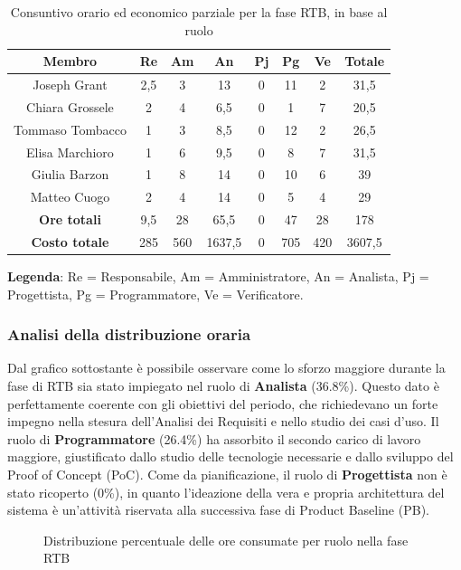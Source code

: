 \documentclass[11pt,a4paper]{article}
\begin{document}
\begin{table}[H]
    \centering
    \begin{tabular}{|c|c|c|c|c|c|c|c|}
        \hline
        \textbf{Membro} & \textbf{Re} & \textbf{Am} & \textbf{An} & \textbf{Pj} & \textbf{Pg} & \textbf{Ve} & \textbf{Totale} \\
        \hline
        Joseph Grant & 2,5 & 3 & 13 & 0 & 11 & 2 & 31,5 \\
        Chiara Grossele & 2 & 4 & 6,5 & 0 & 1 & 7 & 20,5 \\
        Tommaso Tombacco & 1 & 3 & 8,5 & 0 & 12 & 2 & 26,5 \\
        Elisa Marchioro & 1 & 6 & 9,5 & 0 & 8 & 7 & 31,5 \\
        Giulia Barzon & 1 & 8 & 14 & 0 & 10 & 6 & 39 \\
        Matteo Cuogo & 2 & 4 & 14 & 0 & 5 & 4 & 29 \\
        \hline
        \textbf{Ore totali} & 9,5 & 28 & 65,5 & 0 & 47 & 28 & 178 \\
        \hline
        \textbf{Costo totale} & 285 & 560 & 1637,5 & 0 & 705 & 420 & 3607,5 \\
        \hline
    \end{tabular}
    \caption{Consuntivo orario ed economico parziale per la fase RTB, in base al ruolo}
\end{table}

\textbf{Legenda}: Re = Responsabile, Am = Amministratore, An = Analista, Pj = Progettista, Pg = Programmatore, Ve = Verificatore.


\subsubsection{Analisi della distribuzione oraria}
Dal grafico sottostante è possibile osservare come lo sforzo maggiore durante la fase di RTB sia stato impiegato nel ruolo di \textbf{Analista} (36.8\%). Questo dato è perfettamente coerente con gli obiettivi del periodo, che richiedevano un forte impegno nella stesura dell'Analisi dei Requisiti e nello studio dei casi d'uso. 
Il ruolo di \textbf{Programmatore} (26.4\%) ha assorbito il secondo carico di lavoro maggiore, giustificato dallo studio delle tecnologie necessarie e dallo sviluppo del Proof of Concept (PoC).
Come da pianificazione, il ruolo di \textbf{Progettista} non è stato ricoperto (0\%), in quanto l'ideazione della vera e propria architettura del sistema è un'attività riservata alla successiva fase di Product Baseline (PB).

\begin{figure}[H]
    \centering
    \caption{Distribuzione percentuale delle ore consumate per ruolo nella fase RTB}
    \label{fig:torta_ruoli_rtb}
\end{figure}
\end{document}
